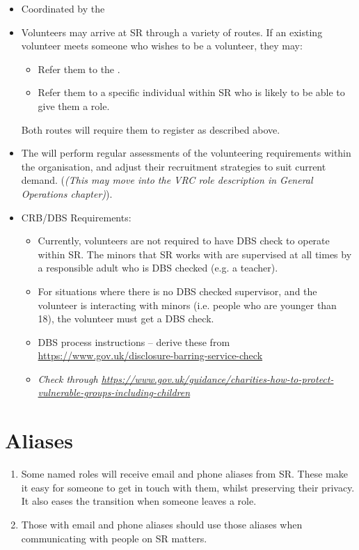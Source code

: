 \begin{itemize}
\item Coordinated by the 
\item Volunteers may arrive at SR through a variety of routes.  If an existing volunteer meets someone who wishes to be a volunteer, they may:
  \begin{itemize}
  \item Refer them to the .
  \item Refer them to a specific individual within SR who is likely to be able to give them a role.
  \end{itemize}
Both routes will require them to register as described above.
  
\item The  will perform regular assessments of the volunteering requirements within the organisation, and adjust their recruitment strategies to suit current demand. (\textit{(This may move into the VRC role description in General Operations chapter)}).

\item CRB/DBS Requirements:
  \begin{itemize}
  \item Currently, volunteers are not required to have  DBS check to operate within SR.  The minors that SR works with are supervised at all times by a responsible adult who is DBS checked (e.g. a teacher).
  \item For situations where there is no DBS checked supervisor, and the volunteer is interacting with minors (i.e. people who are younger than 18), the volunteer must get a DBS check.
  \item DBS process instructions -- derive these from \url{https://www.gov.uk/disclosure-barring-service-check}
  \item \textit{Check through \url{https://www.gov.uk/guidance/charities-how-to-protect-vulnerable-groups-including-children}}
  \end{itemize}
\end{itemize}

\section{Aliases}

\begin{enumerate}
\item Some named roles will receive email and phone aliases from SR.  These make it easy for someone to get in touch with them, whilst preserving their privacy.  It also eases the transition when someone leaves a role.

\item Those with email and phone aliases should use those aliases when communicating with people on SR matters.

\end{enumerate}
